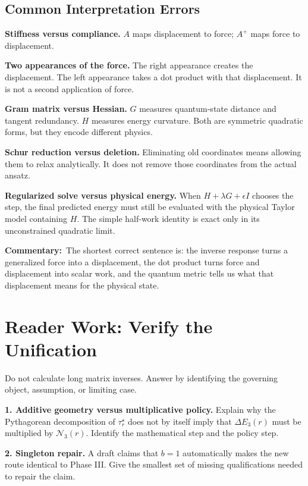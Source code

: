 \documentclass[10pt,twocolumn]{article}
\newcommand{\commentary}[1]{\par\noindent\textbf{Commentary:}\ #1\par}
\newcommand{\conceptbreak}{\par\medskip\noindent{\color{black!30}\rule{\columnwidth}{0.35pt}}\par\medskip}
\begin{document}
\subsection*{Common Interpretation Errors}

\textbf{Stiffness versus compliance.}
\(A\) maps displacement to force; \(A^+\) maps force to displacement.

\textbf{Two appearances of the force.}
The right appearance creates the displacement. The left appearance takes a dot
product with that displacement. It is not a second application of force.

\textbf{Gram matrix versus Hessian.}
\(G\) measures quantum-state distance and tangent redundancy. \(H\) measures
energy curvature. Both are symmetric quadratic forms, but they encode
different physics.

\textbf{Schur reduction versus deletion.}
Eliminating old coordinates means allowing them to relax analytically. It does
not remove those coordinates from the actual ansatz.

\textbf{Regularized solve versus physical energy.}
When \(H+\lambda G+\epsilon I\) chooses the step, the final predicted energy
must still be evaluated with the physical Taylor model containing \(H\). The
simple half-work identity is exact only in its unconstrained quadratic limit.

\commentary{The shortest correct sentence is: the inverse response turns a
generalized force into a displacement, the dot product turns force and
displacement into scalar work, and the quantum metric tells us what that
displacement means for the physical state.}

\conceptbreak

\section*{Reader Work: Verify the Unification}

Do not calculate long matrix inverses. Answer by identifying the governing
object, assumption, or limiting case.

\textbf{1. Additive geometry versus multiplicative policy.}
Explain why the Pythagorean decomposition of \(\tau_r^\star\) does not by
itself imply that \(\Delta E_3(r)\) must be multiplied by
\(\mathcal N_3(r)\). Identify the mathematical step and the policy step.

\textbf{2. Singleton repair.}
A draft claims that \(b=1\) automatically makes the new route identical
to Phase III. Give the smallest set of missing qualifications needed to repair
the claim.
\end{document}
